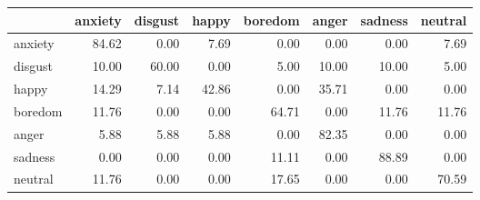 \begin{tabular}{lrrrrrrr}
\toprule
{} &  anxiety &  disgust &  happy &  boredom &  anger &  sadness &  neutral \\
\midrule
anxiety &    84.62 &     0.00 &   7.69 &     0.00 &   0.00 &     0.00 &     7.69 \\
disgust &    10.00 &    60.00 &   0.00 &     5.00 &  10.00 &    10.00 &     5.00 \\
happy   &    14.29 &     7.14 &  42.86 &     0.00 &  35.71 &     0.00 &     0.00 \\
boredom &    11.76 &     0.00 &   0.00 &    64.71 &   0.00 &    11.76 &    11.76 \\
anger   &     5.88 &     5.88 &   5.88 &     0.00 &  82.35 &     0.00 &     0.00 \\
sadness &     0.00 &     0.00 &   0.00 &    11.11 &   0.00 &    88.89 &     0.00 \\
neutral &    11.76 &     0.00 &   0.00 &    17.65 &   0.00 &     0.00 &    70.59 \\
\bottomrule
\end{tabular}

